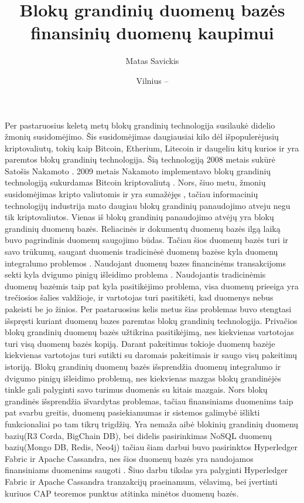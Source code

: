 \documentclass{VUMIFPSkursinis}
\title{Blokų grandinių duomenų bazės finansinių duomenų kaupimui}
\author{Matas Savickis}
\date{Vilnius – \the\year}
\begin{document}
\maketitle

\tableofcontents

Per pastaruosius keletą metų blokų grandinių technologija susilaukė didelio žmonių susidomėjimo. 
Šis susidomėjimas daugiausiai kilo dėl išpopulerėjusių kriptovaliutų, tokių kaip Bitcoin, Etherium, Litecoin ir daugeliu kitų 
kurios ir yra paremtos blokų grandinių technologija. Šią technologiją 2008 metais sukūrė Satošis Nakamoto  \cite{BlockChain}. 
2009 metais Nakamoto implementavo blokų grandinių technologiją sukurdamas Bitcoin kriptovaliutą \cite{Bitcoin}. 
Nors, šiuo metu, žmonių susidomėjimas kripto valiutomis ir yra sumažėjęs \cite{Trends}, tačiau informacinių technologijų industrija 
mato daugiau blokų grandinių panaudojimo atveju negu tik kriptovaliutos. Vienas iš blokų grandinių panaudojimo atvėjų yra 
blokų grandinių duomenų bazės. Reliacinės ir dokumentų duomenų bazės ilgą laiką buvo pagrindinis duomenų saugojimo būdas. 
Tačiau šios duomenų bazės turi ir savo trūkumų, saugant duomenis tradicinėsė duomenų bazėse kyla duomenų integralumo problemos \cite{Integrity}
. 
Naudojant duomenų bazes financinėms transakcijoms sekti kyla dvigumo pinigų išleidimo problema\cite{Double}
. Naudojantis tradicinėmis duomenų bazėmis 
taip pat kyla pasitikėjimo problema, visa duomenų prieeiga yra trečiosios šalies valdžioje, ir vartotojas turi pasitikėti, kad duomenys nebus pakeisti be jo žinios.
Per pastaruosius kelis metus šias problemas
 buvo stengtasi išspręsti kuriant duomenų bazes paremtas blokų grandinių technologija. Privačios blokų grandinių duomenų bazės užtikrina pasitikėjimą, nes kiekvienas vartotojas turi visą duomenų 
bazės kopiją. Darant pakeitimus tokioje duomenų bazėje kiekvienas vartotojas turi sutikti su daromais pakeitimais ir saugo visų pakeitimų istoriją. Blokų grandinių duomenų bazės išsprendžia duomenų integralumo ir
dvigumo pinigų išleidimo problemą, nes kiekvienas mazgas blokų grandinėjės tinkle gali palyginti savo turimus duomenis su kitais mazgais. 
Nors blokų grandinės išsprendžia išvardytas problemas, tačiau finansiniams duomenims taip pat svarbu greitis, duomenų pasiekiamumas ir sistemos galimybė išlikti funkcionaliai po tam tikrų trigdžių. 
Yra nemaža aibė blokinių grandinių duomenų bazių(R3 Corda, BigChain DB), bei didelis pasirinkimas NoSQL duomenų bazių(Mongo DB, Redis, Neo4j) tačiau šiam darbui buvo pasirinktos
Hyperledger Fabric ir Apache Cassandra, nes šios duomenų bazės yra naudojamos finansiniams duomenims saugoti \cite{BnkH} \cite{BnkC}. Šiuo darbu tikslas yra palyginti Hyperledger Fabric ir Apache Cassandra tranzakcijų praeinamum, vėlavimą, bei įvertinti kuriuos CAP teoremos punktus atitinka minėtos duomenų bazės.
\end{document}
